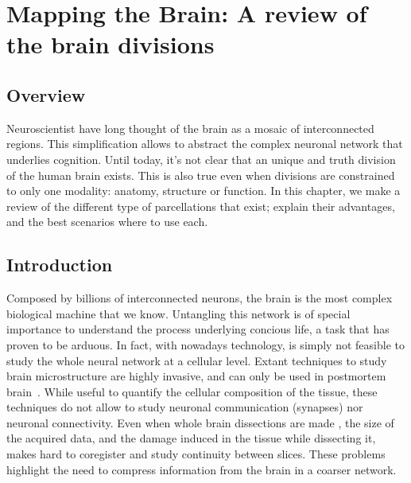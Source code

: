 \chapter{Mapping the Brain: A review of the brain divisions}

\section{Overview}
Neuroscientist have long thought of the brain as a mosaic of interconnected
regions. This simplification allows to abstract the complex neuronal network
that underlies cognition. Until today, it's not clear that an unique and truth
division of the human brain exists. This is also true even when divisions are 
constrained to only one modality: anatomy, structure or function. In this
chapter, we make a review of the different type of parcellations that exist;
explain their advantages, and the best scenarios where to use each.


\section{Introduction}
Composed by billions of interconnected neurons, the brain is the most complex
biological machine that we know. Untangling this network is of special importance
to understand the process underlying concious life, a task that has proven to be
arduous. In fact, with nowadays technology, is simply not feasible
to study the whole neural network at a cellular level. Extant techniques to
study brain microstructure are highly invasive, and can only be used in
postmortem brain~\cite{Swanson1982, Schmahmann2006, Amunts2007, Ding2016}.
While useful to quantify the cellular composition of the tissue, these techniques
do not allow to study neuronal communication (synapses) nor neuronal connectivity.
Even when whole brain dissections are made \cite{Amunts2013, Ding2016}, the size
of the acquired data, and the damage induced in the tissue while dissecting it,
makes hard to coregister and study continuity between slices. These problems
highlight the need to compress information from the brain in a coarser network.

